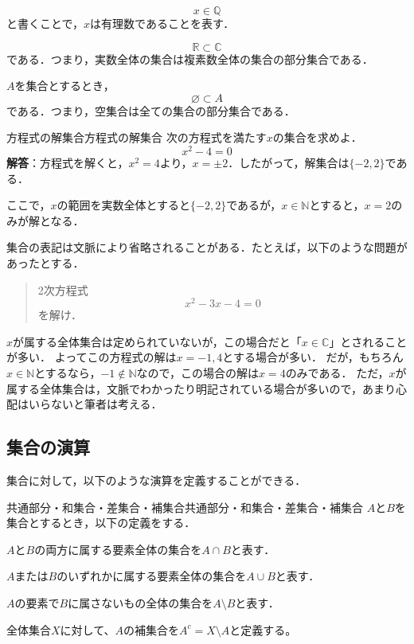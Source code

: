 \documentclass[a4paper,11pt]{ltjsarticle}
\begin{document}
  \begin{example}{}{}
      \[
      x \in \mathbb{Q}
    \]
    と書くことで，$x$は有理数であることを表す．
  \end{example}
  
  \begin{example}{}{}
      \[
      \mathbb{R} \subset \mathbb{C}
    \]
    である．つまり，実数全体の集合は複素数全体の集合の部分集合である．
  \end{example}


  \begin{example}{}{}
    $A$を集合とするとき，
    \[
    \varnothing  \subset A
  \]
  である．つまり，空集合は全ての集合の部分集合である．
\end{example}

  \begin{example}{方程式の解集合}{方程式の解集合}
    次の方程式を満たす$x$の集合を求めよ．
    \[
    x^2 - 4 = 0
    \]
    \textbf{解答}：方程式を解くと，$x^2 = 4$より，$x = \pm 2$．したがって，解集合は$\{ -2, 2 \}$である．

    ここで，$x$の範囲を実数全体とすると$\{ -2, 2 \}$であるが，$x \in \mathbb{N}$とすると，$x = 2$のみが解となる．
\end{example}
集合の表記は文脈により省略されることがある．たとえば，以下のような問題があったとする．
\begin{quotation}
  2次方程式
  \[
  x^2 - 3x -4 =0
  \]
  を解け．
\end{quotation}
$x$が属する全体集合は定められていないが，この場合だと「$x \in \mathbb{C}$」とされることが多い．
よってこの方程式の解は$x = -1 , 4$とする場合が多い．
だが，もちろん$ x \in \mathbb{N}$とするなら，$ -1 \notin \mathbb{N}$なので，この場合の解は$ x= 4$のみである．
ただ，$x$が属する全体集合は，文脈でわかったり明記されている場合が多いので，あまり心配はいらないと筆者は考える．


  \subsection{集合の演算}
  
  集合に対して，以下のような演算を定義することができる．
  
  \begin{definition}{共通部分・和集合・差集合・補集合}{共通部分・和集合・差集合・補集合}
      $A$と$B$を集合とするとき，以下の定義をする．
      \begin{description}[labelwidth=4em]
        \item[共通部分] $A$と$B$の両方に属する要素全体の集合を$A \cap B$と表す．
        \item[和集合] $A$または$B$のいずれかに属する要素全体の集合を$A \cup B$と表す．
        \item[差集合]$A$の要素で$B$に属さないもの全体の集合を$A \setminus B$と表す．
        \item[補集合] 全体集合$X$に対して、$A$の補集合を$A^c = X \setminus A$と定義する。
      \end{description}
  \end{definition}
  
\end{document}
